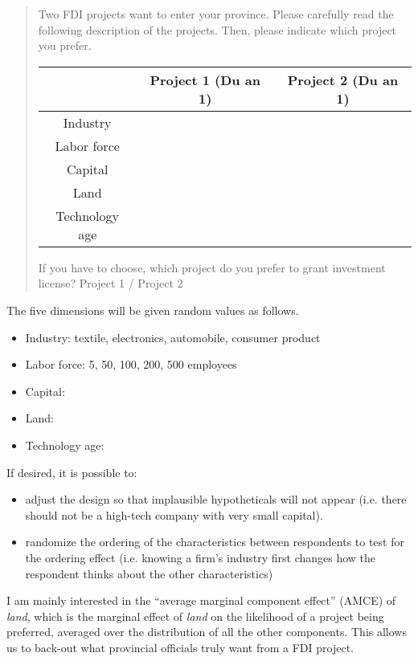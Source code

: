 \begin{quote}
Two FDI projects want to enter your province. Please carefully read the following description of the projects. Then, please indicate which project you prefer.

\begin{center}
  \begin{tabular}{ c | c | c }
    \hline
     & Project 1 (Du an 1) & Project 2 (Du an 1) \\ \hline
    Industry &  &  \\ \hline
    Labor force &  &  \\ \hline
    Capital &  &  \\ \hline
    Land &  &  \\ \hline
    Technology age &  &  \\ \hline
    \hline
  \end{tabular}
\end{center}

If you have to choose, which project do you prefer to grant investment license? Project 1 / Project 2
\end{quote}

The five dimensions will be given random values as follows.
\begin{itemize}
\item Industry: textile, electronics, automobile, consumer product
\item Labor force: 5, 50, 100, 200, 500 employees
\item Capital:
\item Land:
\item Technology age: 
\end{itemize}

If desired, it is possible to:
\begin{itemize}
\item adjust the design so that implausible hypotheticals will not appear (i.e. there should not be a high-tech company with very small capital).
\item randomize the ordering of the characteristics between respondents to test for the ordering effect (i.e. knowing a firm's industry first changes how the respondent thinks about the other characteristics)
\end{itemize}

I am mainly interested in the ``average marginal component effect'' (AMCE) of \textit{land}, which is the marginal effect of \textit{land} on the likelihood of a project being preferred, averaged over the distribution of all the other components. This allows us to back-out what provincial officials truly want from a FDI project.
